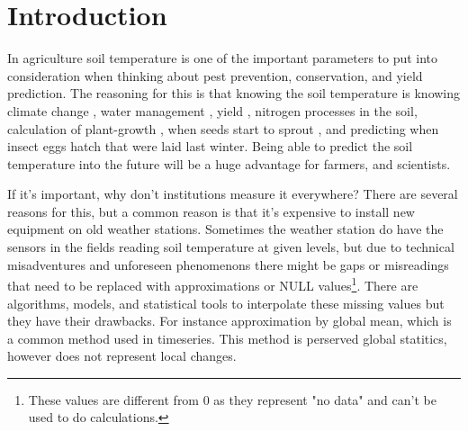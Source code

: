 \section{Introduction}

In agriculture soil temperature is one of the important parameters to put into consideration when thinking about pest prevention, conservation, and yield prediction. The reasoning for this is that knowing the soil temperature is knowing climate change \cite{li_attention-aware_2022}, water management \cite{alizamir_advanced_2020}, yield \cite{sim_prediction_2020}, nitrogen processes \cite{rankinen_simple_2004} in the soil, calculation of plant-growth \cite{li_modeling_2020}, when seeds start to sprout \cite{li_modeling_2020}, and predicting when insect eggs hatch that were laid last winter. Being able to predict the soil temperature into the future will be a huge advantage for farmers, and scientists.

If it's important, why don't institutions measure it everywhere? There are several reasons for this, but a common reason is that it's expensive to install new equipment on old weather stations. Sometimes the weather station do have the sensors in the fields reading soil temperature at given levels, but due to technical misadventures and unforeseen phenomenons there might be gaps or misreadings that need to be replaced with approximations or NULL values\footnote{These values are different from 0 as they represent "no data" and can't be used to do calculations.}. There are algorithms, models, and statistical tools to interpolate these missing values but they have their drawbacks. For instance approximation by global mean, which is a common method used in timeseries\cite{lepot_2017}. This method is perserved global statitics, however does not represent local changes. 



